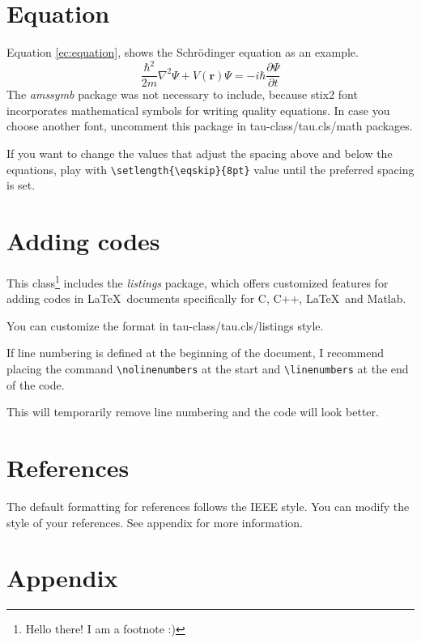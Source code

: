 \documentclass[9pt,a4paper,twocolumn,twoside]{tau-class/tau}
\begin{document}
\section{Equation}

    Equation \ref{ec:equation}, shows the Schrödinger equation as an example. 
	\begin{equation} \label{ec:equation}
		\frac{\hbar^2}{2m}\nabla^2\Psi + V(\mathbf{r})\Psi = -i\hbar \frac{\partial\Psi}{\partial t}
	\end{equation} 
    The \textit{amssymb} package was not necessary to include, because stix2 font incorporates mathematical symbols for writing quality equations. In case you choose another font, uncomment this package in tau-class/tau.cls/math packages.
	
    If you want to change the values that adjust the spacing above and below the equations, play with \verb|\setlength{\eqskip}{8pt}| value until the preferred spacing is set.
	
\section{Adding codes}
	
    This class\footnote{Hello there! I am a footnote :)} includes the \textit{listings} package, which offers customized features for adding codes in \LaTeX\ documents specifically for C, C++, \LaTeX\ and Matlab. 
	
    You can customize the format in tau-class/tau.cls/listings style.
	
    
	
    If line numbering is defined at the beginning of the document, I recommend placing the command \verb|\nolinenumbers| at the start and \verb|\linenumbers| at the end of the code. 
    
    This will temporarily remove line numbering and the code will look better.
	
\section{References}

    The default formatting for references follows the IEEE style. You can modify the style of your references. See appendix for more information.
    
\section{Appendix}
\end{document}
